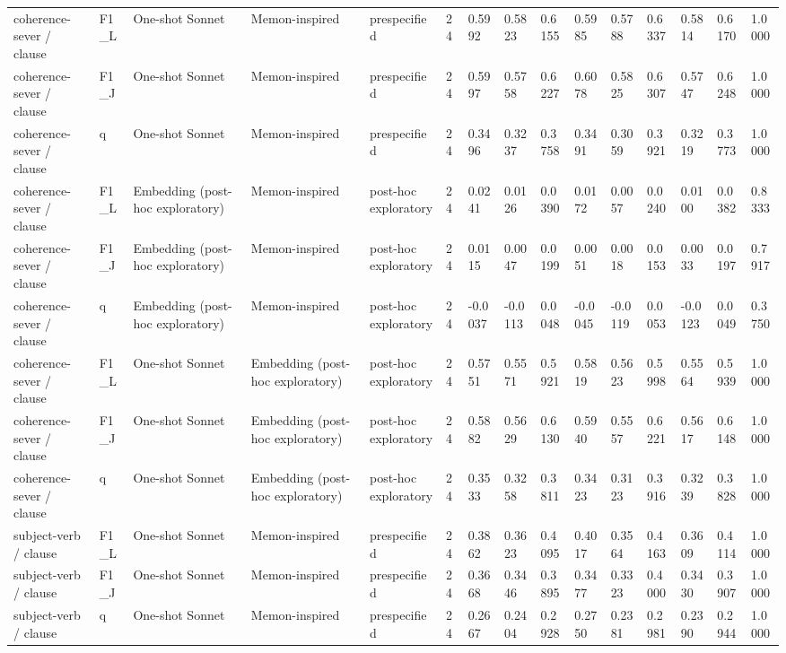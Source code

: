 \begin{table}[t]
{\begin{tabular}{lllllllllllllll}
coherence-sever / clause & F1\_L & One-shot Sonnet & Memon-inspired & prespecified & 24 & 0.5992 & 0.5823 & 0.6155 & 0.5985 & 0.5788 & 0.6337 & 0.5814 & 0.6170 & 1.0000 \\
coherence-sever / clause & F1\_J & One-shot Sonnet & Memon-inspired & prespecified & 24 & 0.5997 & 0.5758 & 0.6227 & 0.6078 & 0.5825 & 0.6307 & 0.5747 & 0.6248 & 1.0000 \\
coherence-sever / clause & q & One-shot Sonnet & Memon-inspired & prespecified & 24 & 0.3496 & 0.3237 & 0.3758 & 0.3491 & 0.3059 & 0.3921 & 0.3219 & 0.3773 & 1.0000 \\
coherence-sever / clause & F1\_L & Embedding (post-hoc exploratory) & Memon-inspired & post-hoc exploratory & 24 & 0.0241 & 0.0126 & 0.0390 & 0.0172 & 0.0057 & 0.0240 & 0.0100 & 0.0382 & 0.8333 \\
coherence-sever / clause & F1\_J & Embedding (post-hoc exploratory) & Memon-inspired & post-hoc exploratory & 24 & 0.0115 & 0.0047 & 0.0199 & 0.0051 & 0.0018 & 0.0153 & 0.0033 & 0.0197 & 0.7917 \\
coherence-sever / clause & q & Embedding (post-hoc exploratory) & Memon-inspired & post-hoc exploratory & 24 & -0.0037 & -0.0113 & 0.0048 & -0.0045 & -0.0119 & 0.0053 & -0.0123 & 0.0049 & 0.3750 \\
coherence-sever / clause & F1\_L & One-shot Sonnet & Embedding (post-hoc exploratory) & post-hoc exploratory & 24 & 0.5751 & 0.5571 & 0.5921 & 0.5819 & 0.5623 & 0.5998 & 0.5564 & 0.5939 & 1.0000 \\
coherence-sever / clause & F1\_J & One-shot Sonnet & Embedding (post-hoc exploratory) & post-hoc exploratory & 24 & 0.5882 & 0.5629 & 0.6130 & 0.5940 & 0.5557 & 0.6221 & 0.5617 & 0.6148 & 1.0000 \\
coherence-sever / clause & q & One-shot Sonnet & Embedding (post-hoc exploratory) & post-hoc exploratory & 24 & 0.3533 & 0.3258 & 0.3811 & 0.3423 & 0.3123 & 0.3916 & 0.3239 & 0.3828 & 1.0000 \\
subject-verb / clause & F1\_L & One-shot Sonnet & Memon-inspired & prespecified & 24 & 0.3862 & 0.3623 & 0.4095 & 0.4017 & 0.3564 & 0.4163 & 0.3609 & 0.4114 & 1.0000 \\
subject-verb / clause & F1\_J & One-shot Sonnet & Memon-inspired & prespecified & 24 & 0.3668 & 0.3446 & 0.3895 & 0.3477 & 0.3323 & 0.4000 & 0.3430 & 0.3907 & 1.0000 \\
subject-verb / clause & q & One-shot Sonnet & Memon-inspired & prespecified & 24 & 0.2667 & 0.2404 & 0.2928 & 0.2750 & 0.2381 & 0.2981 & 0.2390 & 0.2944 & 1.0000 \\

\end{tabular}}
\end{table}
